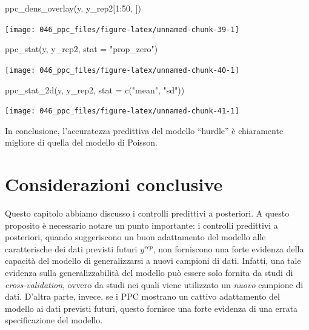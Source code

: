 \documentclass[
  10pt,
  italian,
  a4paper,
  extrafontsizes,onecolumn,openright
  ]{memoir}
\newenvironment{Shaded}{\begin{snugshade}}{\end{snugshade}}
\newcommand{\AttributeTok}[1]{\textcolor[rgb]{0.77,0.63,0.00}{#1}}
\newcommand{\DecValTok}[1]{\textcolor[rgb]{0.00,0.00,0.81}{#1}}
\newcommand{\FunctionTok}[1]{\textcolor[rgb]{0.00,0.00,0.00}{#1}}
\newcommand{\NormalTok}[1]{#1}
\newcommand{\SpecialCharTok}[1]{\textcolor[rgb]{0.00,0.00,0.00}{#1}}
\newcommand{\StringTok}[1]{\textcolor[rgb]{0.31,0.60,0.02}{#1}}
\begin{document}
\begin{Shaded}
\begin{Highlighting}[]
\FunctionTok{ppc\_dens\_overlay}\NormalTok{(y, y\_rep2[}\DecValTok{1}\SpecialCharTok{:}\DecValTok{50}\NormalTok{, ])}
\end{Highlighting}
\end{Shaded}

\begin{center}\texttt{[image: 046\_ppc\_files/figure-latex/unnamed-chunk-39-1]} \end{center}

\begin{Shaded}
\begin{Highlighting}[]
\FunctionTok{ppc\_stat}\NormalTok{(y, y\_rep2, }\AttributeTok{stat =} \StringTok{"prop\_zero"}\NormalTok{)}
\end{Highlighting}
\end{Shaded}

\begin{center}\texttt{[image: 046\_ppc\_files/figure-latex/unnamed-chunk-40-1]} \end{center}

\begin{Shaded}
\begin{Highlighting}[]
\FunctionTok{ppc\_stat\_2d}\NormalTok{(y, y\_rep2, }\AttributeTok{stat =} \FunctionTok{c}\NormalTok{(}\StringTok{"mean"}\NormalTok{, }\StringTok{"sd"}\NormalTok{))}
\end{Highlighting}
\end{Shaded}

\begin{center}\texttt{[image: 046\_ppc\_files/figure-latex/unnamed-chunk-41-1]} \end{center}

In conclusione, l'accuratezza predittiva del modello ``hurdle'' è chiaramente migliore di quella del modello di Poisson.

\hypertarget{considerazioni-conclusive}{%
\section*{Considerazioni conclusive}\label{considerazioni-conclusive}}

Questo capitolo abbiamo discusso i controlli predittivi a posteriori. A questo proposito è necessario notare un punto importante: i controlli predittivi a posteriori, quando suggeriscono un buon adattamento del modello alle caratterische dei dati previsti futuri \(y^{rep}\), non forniscono una forte evidenza della capacità del modello di generalizzarsi a nuovi campioni di dati. Infatti, una tale evidenza sulla generalizzabilità del modello può essere solo fornita da studi di \emph{cross-validation}, ovvero da studi nei quali viene utilizzato un \emph{nuovo} campione di dati. D'altra parte, invece, se i PPC mostrano un cattivo adattamento del modello ai dati previsti futuri, questo fornisce una forte evidenza di una errata specificazione del modello.
\end{document}
